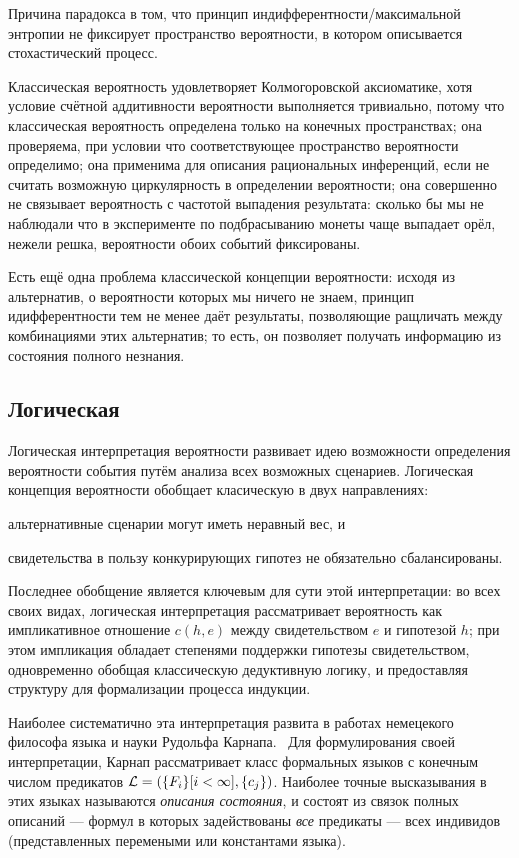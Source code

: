 \documentclass[14pt]{extarticle}
\begin{document}
Причина парадокса в том, что принцип индифферентности/максимальной энтропии не фиксирует пространство вероятности, в котором описывается стохастический процесс.

Классическая вероятность удовлетворяет Колмогоровской аксиоматике, хотя условие счётной аддитивности вероятности выполняется тривиально, потому что классическая вероятность определена только на конечных пространствах; она проверяема, при условии что соответствующее пространство вероятности определимо; она применима для описания рациональных инференций, если не считать возможную циркулярность в определении вероятности; она совершенно не связывает вероятность с частотой выпадения результата: сколько бы мы не наблюдали что в эксперименте по подбрасыванию монеты чаще выпадает орёл, нежели решка, вероятности обоих событий фиксированы.

Есть ещё одна проблема классической концепции вероятности: исходя из альтернатив, о вероятности которых мы ничего не знаем, принцип идифферентности тем не менее даёт результаты, позволяющие ращличать между комбинациями этих альтернатив; то есть, он позволяет получать информацию из состояния полного незнания.

\subsection{Логическая}

Логическая интерпретация вероятности развивает идею возможности определения вероятности события путём анализа всех возможных сценариев. Логическая концепция вероятности обобщает класическую в двух направлениях:
\begin{inparaenum}[a)]
\item альтернативные сценарии могут иметь неравный вес, и
\item свидетельства в пользу конкурирующих гипотез не обязательно сбалансированы.
\end{inparaenum}

Последнее обобщение является ключевым для сути этой интерпретации: во всех своих видах, логическая интерпретация рассматривает вероятность как импликативное отношение $c(h, e)$ между свидетельством $e$ и гипотезой $h$; при этом импликация обладает степенями поддержки гипотезы свидетельством, одновременно обобщая классическую дедуктивную логику, и предоставляя структуру для формализации процесса индукции.

Наиболее систематично эта интерпретация развита в работах немецекого философа языка и науки Рудольфа Карнапа.~\cite{LogicalProbability} Для формулирования своей интерпретации, Карнап рассматривает класс формальных языков с конечным числом предикатов $\mathcal{L} = (\Set{F_i}[i<\infty], \Set{c_j})$. Наиболее точные высказывания в этих языках называются \emph{описания состояния}, и состоят из связок полных описаний --- формул в которых задействованы \emph{все} предикаты --- всех индивидов (представленных перемеными или константами языка).
\end{document}
